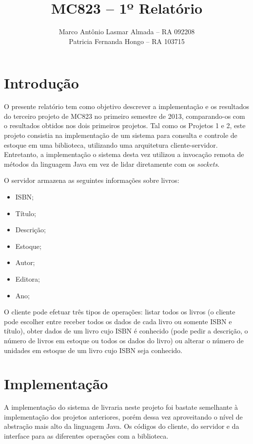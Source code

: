 \documentclass[11pt, brazil]{article} %
\title{MC823 -- 1º Relatório}
\author{Marco Antônio Lasmar Almada -- RA 092208 \\ Patricia Fernanda Hongo -- RA 103715}
\date{} %
\begin{document}
\maketitle

\section{Introdução}

O presente relatório tem como objetivo descrever a implementação e os resultados do terceiro projeto de MC823 no primeiro semestre de 2013, comparando-os com o resultados obtidos nos dois primeiros projetos. Tal como os Projetos 1 e 2, este projeto consistia na implementação de um sistema para consulta e controle de estoque em uma biblioteca, utilizando uma arquitetura cliente-servidor. Entretanto, a implementação o sistema desta vez utilizou a invocação remota de métodos da linguagem Java em vez de lidar diretamente com os \emph{sockets}.

O servidor armazena as seguintes informações sobre livros:
\begin{itemize}
  \item ISBN;
  \item Título;
  \item Descrição;
  \item Estoque;
  \item Autor;
  \item Editora;
  \item Ano;  
\end{itemize}

O cliente pode efetuar três tipos de operações: listar todos os livros (o cliente pode escolher entre receber todos os dados de cada livro ou somente ISBN e título), obter dados de um livro cujo ISBN é conhecido (pode pedir a descrição, o número de livros em estoque ou todos os dados do livro) ou alterar o número de unidades em estoque de um livro cujo ISBN seja conhecido.

\section{Implementação}


A implementação do sistema de livraria neste projeto foi bastate semelhante à implementação dos projetos anteriores, porém dessa vez aproveitando o nível de abstração mais alto da linguagem Java. Os códigos do cliente, do servidor e da interface para as diferentes operações com a biblioteca.
\end{document}
